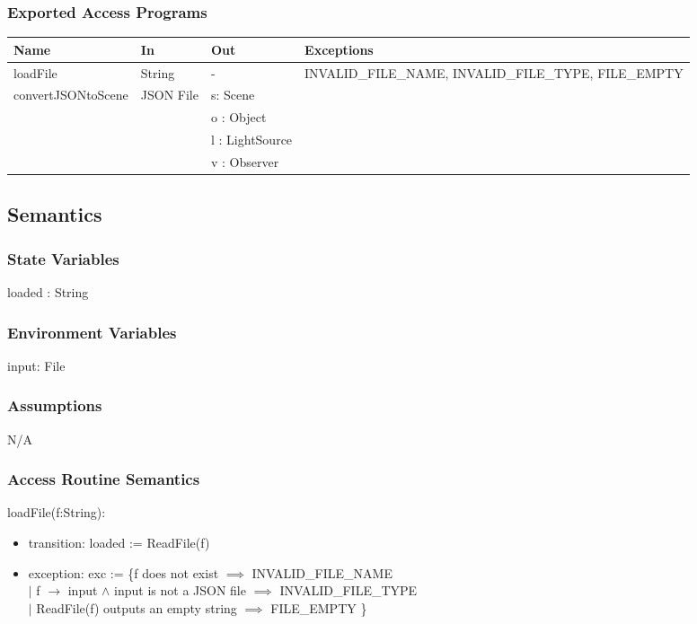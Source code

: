\documentclass[12pt, titlepage]{article}
\begin{document}
\subsubsection{Exported Access Programs}
\begin{center}
	\begin{tabular}{p{4cm} p{2cm} p{2cm} p{4cm}}
		\hline
		\textbf{Name} & \textbf{In} & \textbf{Out} & \textbf{Exceptions} \\
		\hline
		loadFile & String & - & INVALID\_FILE\_NAME, INVALID\_FILE\_TYPE, 
		FILE\_EMPTY\\
		\multirow{4}{*}{convertJSONtoScene} & \multirow{4}{2cm}{JSON File} & s: 
		Scene & \\
		& & o : Object & \\
		& & l : LightSource & \\
		& & v : Observer & \\
		\hline
	\end{tabular}
\end{center}

\subsection{Semantics}
\subsubsection{State Variables}
loaded : String %

\subsubsection{Environment Variables}
input: File

\subsubsection{Assumptions}
N/A

\subsubsection{Access Routine Semantics}
\noindent loadFile(f:String):
\begin{itemize}
	\item transition: loaded := ReadFile(f)
	\item exception: exc := \{f does not exist $\implies$ INVALID\_FILE\_NAME\\
	$|$ f $\to$ input $\land$ input is not a JSON file $\implies$ 
	INVALID\_FILE\_TYPE\\
	$|$ ReadFile(f) outputs an empty string $\implies$ FILE\_EMPTY
	\}
\end{itemize}
\end{document}
